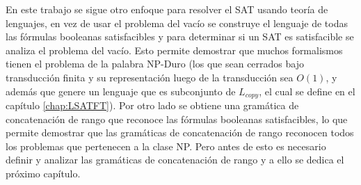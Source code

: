 En este trabajo se sigue otro enfoque para resolver el SAT usando teoría de lenguajes, en vez de usar el problema del vacío se 
construye el lenguaje de todas las fórmulas booleanas satisfacibles y para determinar si un SAT es satisfacible 
se analiza el problema del vacío. Esto permite demostrar que muchos formalismos tienen el problema de la palabra 
NP-Duro (los que sean cerrados bajo transducción finita y su representación luego de la transducción sea $O(1)$, 
y además que genere un lenguaje que es subconjunto de $L_{copy}$, el cual se define en el capítulo 
\ref{chap:LSATFT}). Por otro lado se obtiene una gramática de concatenación de rango que reconoce las fórmulas 
booleanas satisfacibles, lo que permite demostrar que las gramáticas de concatenación de rango reconocen todos 
los problemas que pertenecen a la clase NP. Pero antes de esto es necesario definir y analizar las gramáticas 
de concatenación de rango y a ello se dedica el próximo capítulo.
